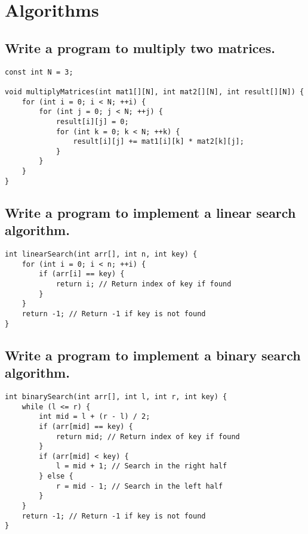 \section{Algorithms}

\subsection{Write a program to multiply two matrices.}
\begin{tcolorbox}[title=]
\begin{verbatim}
const int N = 3;

void multiplyMatrices(int mat1[][N], int mat2[][N], int result[][N]) {
    for (int i = 0; i < N; ++i) {
        for (int j = 0; j < N; ++j) {
            result[i][j] = 0;
            for (int k = 0; k < N; ++k) {
                result[i][j] += mat1[i][k] * mat2[k][j];
            }
        }
    }
}    
\end{verbatim}
\end{tcolorbox}

\subsection{Write a program to implement a linear search algorithm.}
\begin{tcolorbox}[title=]
\begin{verbatim}
int linearSearch(int arr[], int n, int key) {
    for (int i = 0; i < n; ++i) {
        if (arr[i] == key) {
            return i; // Return index of key if found
        }
    }
    return -1; // Return -1 if key is not found
}
\end{verbatim}
\end{tcolorbox}

\subsection{Write a program to implement a binary search algorithm.}
\begin{tcolorbox}[title=]
\begin{verbatim}
int binarySearch(int arr[], int l, int r, int key) {
    while (l <= r) {
        int mid = l + (r - l) / 2;
        if (arr[mid] == key) {
            return mid; // Return index of key if found
        }
        if (arr[mid] < key) {
            l = mid + 1; // Search in the right half
        } else {
            r = mid - 1; // Search in the left half
        }
    }
    return -1; // Return -1 if key is not found
}
\end{verbatim}
\end{tcolorbox}


